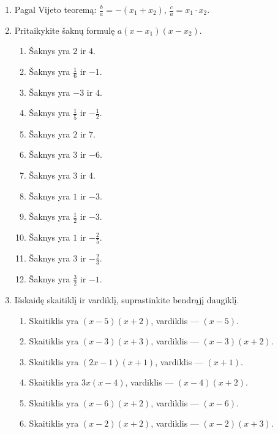 \documentclass[11pt,a4paper]{scrartcl}
\begin{document}
\begin{enumerate}[label=\textbf{\arabic*.}, leftmargin=*]
\begin{enumerate}[label={(\arabic*)}]
        \item $2m(3m+1)+3(3m+1)$.
        \item $y(y-4)-1(y-4)$.
        \item $x(x-7)-2(x-7)$.
        \item $ab(b+c)+c(b+c)$.
        \item $x^2(x+3)+2(x+3)$.
        \item $x^2(x-1)-y^2(x-1)$.
    \end{enumerate}
    \item Pagal Vijeto teoremą: $\frac{b}{a}=-(x_1+x_2)$, $\frac{c}{a}=x_1\cdot x_2$.
    \item Pritaikykite šaknų formulę $a(x-x_1)(x-x_2)$.
    \begin{enumerate}[label={(\arabic*)}]
        \item Šaknys yra $2$ ir $4$.
        \item Šaknys yra $\frac16$ ir $-1$.
        \item Šaknys yra $-3$ ir $4$.
        \item Šaknys yra $\frac15$ ir $-\frac12$.
        \item Šaknys yra $2$ ir $7$.
        \item Šaknys yra $3$ ir $-6$.
        \item Šaknys yra $3$ ir $4$.
        \item Šaknys yra $1$ ir $-3$.
        \item Šaknys yra $\frac12$ ir $-3$.
        \item Šaknys yra $1$ ir $-\frac25$.
        \item Šaknys yra $3$ ir $-\frac23$.
        \item Šaknys yra $\frac32$ ir $-1$.
    \end{enumerate}
    \item Išskaidę skaitiklį ir vardiklį,  suprastinkite bendrąjį daugiklį.
    \begin{enumerate}[label={(\arabic*)}]
        \item Skaitiklis yra $(x-5)(x+2)$, vardiklis — $(x-5)$.
        \item Skaitiklis yra $(x-3)(x+3)$, vardiklis — $(x-3)(x+2)$.
        \item Skaitiklis yra $(2x-1)(x+1)$, vardiklis — $(x+1)$.
        \item Skaitiklis yra $3x(x-4)$, vardiklis — $(x-4)(x+2)$.
        \item Skaitiklis yra $(x-6)(x+2)$, vardiklis — $(x-6)$.
        \item Skaitiklis yra $(x-2)(x+2)$, vardiklis — $(x-2)(x+3)$.
    \end{enumerate}
\end{enumerate}
\end{document}
